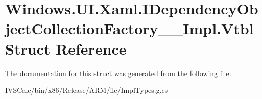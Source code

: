 \hypertarget{struct_windows_1_1_u_i_1_1_xaml_1_1_i_dependency_object_collection_factory_____impl_1_1_vtbl}{}\section{Windows.\+U\+I.\+Xaml.\+I\+Dependency\+Object\+Collection\+Factory\+\_\+\+\_\+\+Impl.\+Vtbl Struct Reference}
\label{struct_windows_1_1_u_i_1_1_xaml_1_1_i_dependency_object_collection_factory_____impl_1_1_vtbl}


The documentation for this struct was generated from the following file\+:\begin{DoxyCompactItemize}
\item 
I\+V\+S\+Calc/bin/x86/\+Release/\+A\+R\+M/ilc/Impl\+Types.\+g.\+cs\end{DoxyCompactItemize}
